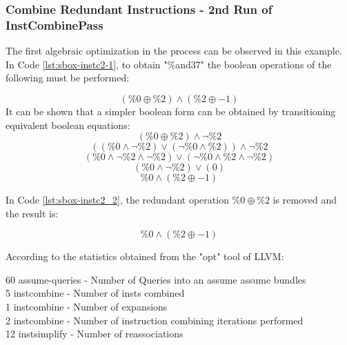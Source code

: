 


\subsubsection{Combine Redundant Instructions - 2nd Run of InstCombinePass}





The first algebraic optimization in the process can be observed in this example. In Code \ref{lst:sbox-instc2-1}, to obtain "\%and37" the boolean operations of the following must be performed:

$$ (\%0 \oplus \%2)  \land ( \%2 \oplus -1)  $$
It can be shown that a simpler boolean form can be obtained by transitioning equivalent boolean equations:
$$ (\%0 \oplus \%2)  \land  \lnot \%2   $$
$$ ((\%0 \land \lnot \%2) \lor (\lnot \%0 \land \%2))  \land  \lnot \%2   $$
$$ (\%0 \land \lnot \%2\land  \lnot \%2) \lor (\lnot \%0 \land \%2\land  \lnot \%2)     $$
$$ (\%0 \land \lnot \%2) \lor (0)     $$
$$ \%0 \land (\%2 \oplus -1) $$

In Code \ref{lst:sbox-instc2_2}, the redundant operation $\%0 \oplus \%2$ is removed and the result is: 

$$ \%0  \land ( \%2 \oplus -1)  $$

According to the statistics obtained from the "opt" tool of LLVM:
\begin{displayquote}
60 assume-queries - Number of Queries into an assume assume bundles \\
 5 instcombine    - Number of insts combined \\
 1 instcombine    - Number of expansions \\
 2 instcombine    - Number of instruction combining iterations performed \\ 
12 instsimplify   - Number of reassociations \\
\end{displayquote}

